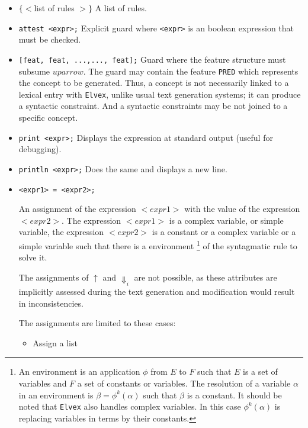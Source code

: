 \documentclass[11pt]{article}
\begin{document}
\begin{itemize}

\item $\{<$list of rules $>\}$ A list of rules.

\item \verb#attest <expr>;# Explicit guard where \verb#<expr># is an
  boolean expression that must be checked.

\item \verb#[feat, feat, ...,..., feat];# Guard where the feature
  structure must subsume $uparrow$. The guard may contain the feature
  \verb#PRED# which represents the concept to be generated. Thus, a
  concept is not necessarily linked to a lexical entry with
  \texttt{Elvex}, unlike usual text generation systems; it can produce
  a syntactic constraint. And a syntactic constraints may be not
  joined to a specific concept.

\item \verb#print <expr>;# Displays the expression at standard output
  (useful for debugging).

\item \verb#println <expr>;# Does the same and displays a new line.
  
\item  \verb#<expr1> = <expr2>;#
  
  An assignment of the expression $<expr1>$ with the value of the
  expression $<expr2>$. The expression $<expr1>$ is a complex
  variable, or simple variable, the expression $<expr2>$ is a constant
  or a complex variable or a simple variable such that there is a
  environment \footnote{An environment is an application $\phi$ from
    $E$ to $F$ such that $E$ is a set of variables and $F$ a set of
    constants or variables. The resolution of a variable $\alpha$ in
    an environment is $\beta = \phi^k(\alpha)$ such that $\beta$ is a
    constant. It should be noted that \texttt{Elvex} also handles
    complex variables. In this case $\phi^k(\alpha)$ is replacing
    variables in terms by their constants. } of the syntagmatic rule
  to solve it.
    
The assignments of $\uparrow$ and $\Downarrow_i$ are not
  possible, as these attributes are implicitly assessed during the
  text generation and modification would result in
  inconsistencies.

    The assignments are limited to these cases:
    \begin{itemize}
      
    \item Assign a list
      

\end{itemize}
\end{itemize}
\end{document}
